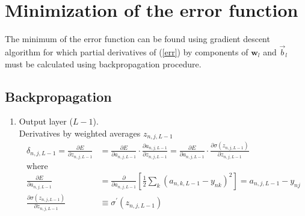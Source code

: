\documentclass[10pt]{article}
\begin{document}
\section{Minimization of the error function}
The minimum of the error function can be found using gradient descent algorithm for which partial derivatives of (\ref{err}) by components of  $\textbf{w}_l$ and $\vec {b}_l$ must be calculated using backpropagation procedure.
\subsection{Backpropagation}
\begin{enumerate}
\item Output layer ($L-1$). \\
Derivatives by weighted averages $z_{n,j,L-1}$
\begin{align}
\delta_{n,j,L-1} = \frac{\partial E}{\partial z_{n,j,L-1}} &= \frac{\partial E}{\partial a_{n,j,L-1}} \cdot \frac{\partial a_{n,j,L-1}}{\partial z_{n,j,L-1}} 
=  \frac{\partial E}{\partial a_{n,j,L-1}} \cdot \frac{\partial \sigma(z_{n,j,L-1})}{\partial z_{n,j,L-1}} \\
\text{where}\\
\frac{\partial E}{\partial a_{n,j,L-1}} &= \frac{\partial }{\partial a_{n,j,L-1}} 
\left[ \frac{1}{2}\sum_k \left( a_{n,k,L-1} - y_{nk}  \right)^2    \right] = a_{n,j,L-1} - y_{nj}\\
\frac{\partial \sigma(z_{n,j,L-1})}{\partial z_{n,j,L-1}} &\equiv \sigma^{'}(z_{n,j,L-1})  
\end{align} 


\end{enumerate}
\end{document}

